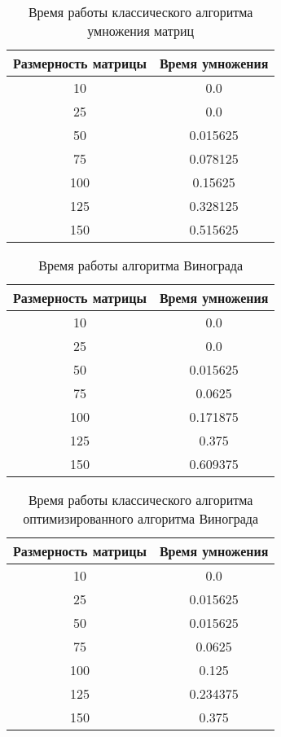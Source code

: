 \begin{table}[h!]
  \begin{center}
    \captionsetup{justification=raggedright}
    \caption{Время работы классического алгоритма умножения матриц}
    \label{tab:workcost_classic}
    \begin{tabular}{c|c}
      \textbf{Размерность матрицы} & \textbf{Время умножения}\\
      \hline
	10 & 0.0\\
	25 & 0.0\\
	50 & 0.015625\\
	75 & 0.078125\\
	100 & 0.15625\\
	125 & 0.328125\\
	150 & 0.515625\\
    \end{tabular}
  \end{center}
\end{table}

\begin{table}[h!]
  \begin{center}
    \captionsetup{justification=raggedright}
    \caption{Время работы алгоритма Винограда}
    \label{tab:workcost_classic}
    \begin{tabular}{c|c}
      \textbf{Размерность матрицы} & \textbf{Время умножения}\\
      \hline
	10 & 0.0\\
	25 & 0.0\\
	50 & 0.015625\\
	75 & 0.0625\\
	100 & 0.171875\\
	125 & 0.375\\
	150 & 0.609375\\
    \end{tabular}
  \end{center}
\end{table}

\begin{table}[h!]
  \begin{center}
    \captionsetup{justification=raggedright}
    \caption{Время работы классического алгоритма оптимизированного алгоритма Винограда}
    \label{tab:workcost_classic}
    \begin{tabular}{c|c}
      \textbf{Размерность матрицы} & \textbf{Время умножения}\\
      \hline
	10 & 0.0\\
	25 & 0.015625\\
	50 & 0.015625\\
	75 & 0.0625\\
	100 & 0.125\\
	125 & 0.234375\\
	150 & 0.375\\
    \end{tabular}
  \end{center}
\end{table}

